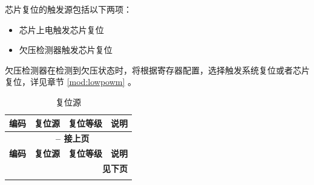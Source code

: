 \documentclass[main\_\_CN.tex]{subfiles}
\begin{document}
\begin{ThreePartTable}

\begin{TableNotes}
            \item[1] 芯片复位的触发源包括以下两项：
                \begin{itemize}
                \item 芯片上电触发芯片复位
                \item 欠压检测器触发芯片复位
                \end{itemize}
            \item[2] 欠压检测器在检测到欠压状态时，将根据寄存器配置，选择触发系统复位或者芯片复位，详见章节 \ref{mod:lowpowm} \textit{}。
\end{TableNotes}

\begin{longtable}[c]{ |l|m{3.5cm}|m{1.8cm}|m{9.2cm}| }
    \caption{复位源}
    \label{tab:resclk-reset-src}\\\hline

    \rowcolor{lightgray}
    \textbf{编码} & \textbf{复位源} & \textbf{复位等级} &   \textbf{说明} \\\hline
    \endfirsthead


    \multicolumn{4}{c}{\bfseries \tablename\ \thetable{} -- 接上页}\\\hline
    \rowcolor{lightgray}
    \textbf{编码} & \textbf{复位源} & \textbf{复位等级} &   \textbf{说明} \\\hline
    \endhead

    \multicolumn{4}{r}{\textbf{见下页}} \\
    \endfoot


\end{longtable}
\end{ThreePartTable}
\end{document}
